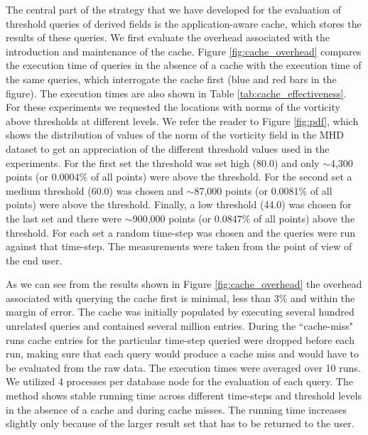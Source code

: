\documentclass{sig-alternate}
\begin{document}
The central part of the strategy that we have developed for the evaluation of threshold queries of derived fields is the application-aware cache, which
stores the results of these queries. We first evaluate the overhead associated with the introduction and maintenance of the cache. Figure
\ref{fig:cache_overhead} compares the execution time of queries in the absence of a cache with the execution time of the same queries, which interrogate
the cache first (blue and red bars in the figure). The execution times are also shown in Table \ref{tab:cache_effectiveness}. 
For these experiments we requested
the locations with norms of the vorticity above thresholds at different levels. We refer the reader to Figure \ref{fig:pdf}, which shows the distribution of values of
the norm of the vorticity field in the MHD dataset to get an appreciation of the different threshold values used in the experiments. 
For the first set the threshold was set high (80.0) and only $\sim$4,300 points 
(or 0.0004\% of all points) were above the threshold. For the second set a medium threshold (60.0) was chosen and $\sim$87,000 points 
(or 0.0081\% of all points) were above the threshold. Finally, a low threshold (44.0) was chosen for the last set and there were $\sim$900,000 points 
(or 0.0847\% of all points) above the threshold. For each set a random
time-step was chosen and the queries were run against that time-step. The measurements were taken from the point of view of the end user. 

As we can see from the results shown in Figure \ref{fig:cache_overhead} the overhead associated with querying the cache first is minimal, 
less than 3\% and within the margin of error.
The cache was initially populated by executing several hundred unrelated queries and contained several million entries.
During the ``cache-miss" runs cache entries for the particular time-step queried were dropped before each run, making sure that each query would
produce a cache miss and would have to be evaluated from the raw data. 
The execution times were averaged over 10 runs.
We utilized 4 processes per database node for the evaluation of each query. 
The method shows stable running time across different time-steps and threshold levels in the absence of a cache and during cache misses.
The running time increases slightly only because of the larger result set that has to be returned to the user.
\end{document}
